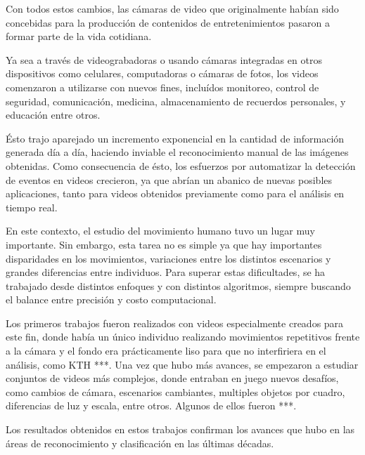 Con todos estos cambios, las cámaras de video que originalmente habían sido concebidas para la producción de contenidos de entretenimientos pasaron a
formar parte de la vida cotidiana.

Ya sea a través de videograbadoras o usando cámaras integradas en otros dispositivos como celulares, computadoras o cámaras de fotos, los videos
comenzaron a utilizarse con nuevos fines, incluídos monitoreo, control de seguridad, comunicación, medicina, almacenamiento de recuerdos personales,
y educación entre otros.

Ésto trajo aparejado un incremento exponencial en la cantidad de información generada día a día, haciendo inviable el reconocimiento manual de las
imágenes obtenidas. Como consecuencia de ésto, los esfuerzos por automatizar la detección de eventos en videos crecieron, ya que abrían un abanico
de nuevas posibles aplicaciones, tanto para videos obtenidos previamente como para el análisis en tiempo real.

En este contexto, el estudio del movimiento humano tuvo un lugar muy importante. Sin embargo, esta tarea no es simple ya que hay importantes disparidades
en los movimientos, variaciones entre los distintos escenarios y grandes diferencias entre individuos. Para superar estas dificultades, se ha trabajado
desde distintos enfoques y con distintos algoritmos, siempre buscando el balance entre precisión y costo computacional.

Los primeros trabajos fueron realizados con videos especialmente creados para este fin, donde había un único individuo realizando movimientos repetitivos
frente a la cámara y el fondo era prácticamente liso para que no interfiriera en el análisis,  como KTH ***. Una vez que hubo más avances, se empezaron a
estudiar conjuntos de videos más complejos, donde entraban en juego nuevos desafíos, como cambios de cámara, escenarios cambiantes, multiples objetos por
cuadro, diferencias de luz y escala, entre otros. Algunos de ellos fueron ***.

Los resultados obtenidos en estos trabajos confirman los avances que hubo en las áreas de reconocimiento y clasificación en las últimas décadas.





\iffalse
Un método común y que ha resultado ser eficiente para obtener información a partir de imágenes es la utilización de descriptores.
Estos descriptores informan acerca de las características visuales de la imagen, describiendo características elementales como la forma, el color,
la textura y la ubicación de elementos dentro de la misma.
Para extender esta idea al plano de los videos, lo que se hace es desglosar el video en las imágenes que lo componen (frames), para luego analizar por separado
cada una de ellas. Con esta información ya disponible se incorpora el factor temporal, siendo éste el eje en la relación entre los distintos frames, permitiendo,
por ejemplo, analizar variaciones de un frame a otro.
\fi
